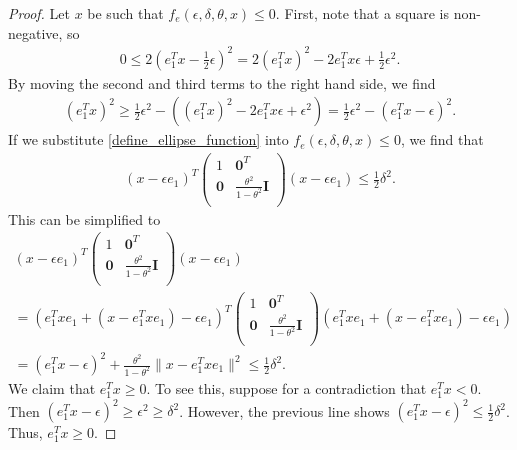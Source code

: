 \begin{proof}
Let $x$ be such that $f_e(\epsilon, \delta, \theta, x) \le 0$.
First, note that a square is non-negative, so
\begin{align*}
0 \le 2\left(e_1^Tx - \frac 1 2 \epsilon \right)^2
= 2\left(e_1^Tx\right)^2 - 2e_1^Tx\epsilon + \frac 1 2 \epsilon^2.
\end{align*}
By moving the second and third terms to the right hand side, we find
\begin{align}
\left(e_1^Tx\right)^2 \ge \frac 1 2 \epsilon^2 - \left(\left(e_1^Tx\right)^2 - 2e_1^Tx\epsilon + \epsilon^2\right) 
= \frac 1 2 \epsilon^2 - (e_1^Tx - \epsilon)^2. \label{ellipse_in_cone_eqn1}
\end{align}
If we substitute \cref{define_ellipse_function} into $f_e(\epsilon, \delta, \theta, x) \le 0$, we find that
\begin{align*}
(x - \epsilon e_1)^T\begin{pmatrix}
1 & \boldsymbol0^T \\
\boldsymbol 0 & \frac{\theta^2}{1 - \theta^2} \boldsymbol I \\
\end{pmatrix}(x - \epsilon e_1) \le \frac 1 2 \delta^2.
\end{align*}
This can be simplified to
\begin{align*}
(x - \epsilon e_1)^T\begin{pmatrix}
1 & \boldsymbol0^T \\
\boldsymbol 0 & \frac{\theta^2}{1 - \theta^2} \boldsymbol I \\
\end{pmatrix}(x - \epsilon e_1) \\
 = (e_1^Txe_1 + (x - e_1^Txe_1) - \epsilon e_1)^T\begin{pmatrix}
1 & \boldsymbol0^T \\
\boldsymbol 0 & \frac{\theta^2}{1 - \theta^2} \boldsymbol I \\
\end{pmatrix}(e_1^Txe_1 + (x - e_1^Txe_1) - \epsilon e_1)  \\
=
(e_1^Tx - \epsilon)^2 + \frac{\theta^2}{1 - \theta^2}\|x - e_1^Tx e_1\|^2 \le \frac 1 2 \delta^2.
\end{align*}
We claim that $e_1^Tx \ge 0$.   To see this, suppose for a contradiction that $e_1^Tx < 0$.  Then $(e_1^Tx - \epsilon)^2 \ge \epsilon^2 \ge \delta^2$.
However, the previous line shows $(e_1^Tx - \epsilon)^2 \le \frac 1 2 \delta^2$.
Thus, $e_1^Tx \ge 0$.


\end{proof}
